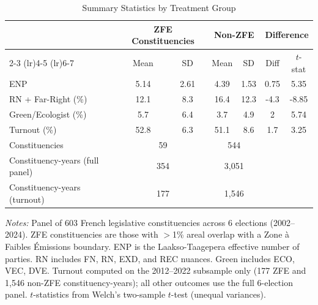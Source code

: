 \begin{table}[H]
\centering
\caption{Summary Statistics by Treatment Group}
\label{tab:summary}
\begin{threeparttable}
\begin{tabular}{lcccccc}
\toprule
 & \multicolumn{2}{c}{ZFE Constituencies} & \multicolumn{2}{c}{Non-ZFE} & \multicolumn{2}{c}{Difference} \\
 \cmidrule(lr){2-3} \cmidrule(lr){4-5} \cmidrule(lr){6-7}
 & Mean & SD & Mean & SD & Diff & $t$-stat \\
\midrule
ENP & 5.14 & 2.61 & 4.39 & 1.53 & 0.75 & 5.35 \\
RN + Far-Right (\%) & 12.1 & 8.3 & 16.4 & 12.3 & -4.3 & -8.85 \\
Green/Ecologist (\%) & 5.7 & 6.4 & 3.7 & 4.9 & 2 & 5.74 \\
Turnout (\%) & 52.8 & 6.3 & 51.1 & 8.6 & 1.7 & 3.25 \\
\midrule
Constituencies & \multicolumn{2}{c}{59} & \multicolumn{2}{c}{544} & & \\
Constituency-years (full panel) & \multicolumn{2}{c}{354} & \multicolumn{2}{c}{3,051} & & \\
Constituency-years (turnout) & \multicolumn{2}{c}{177} & \multicolumn{2}{c}{1,546} & & \\
\bottomrule
\end{tabular}
\begin{tablenotes}[flushleft]
\small
\item \textit{Notes:} Panel of 603 French legislative constituencies across 6 elections (2002--2024). ZFE constituencies are those with $>$1\% areal overlap with a Zone \`a Faibles \'Emissions boundary. ENP is the Laakso-Taagepera effective number of parties. RN includes FN, RN, EXD, and REC nuances. Green includes ECO, VEC, DVE. Turnout computed on the 2012--2022 subsample only (177 ZFE and 1,546 non-ZFE constituency-years); all other outcomes use the full 6-election panel. $t$-statistics from Welch's two-sample $t$-test (unequal variances).
\end{tablenotes}
\end{threeparttable}
\end{table}
